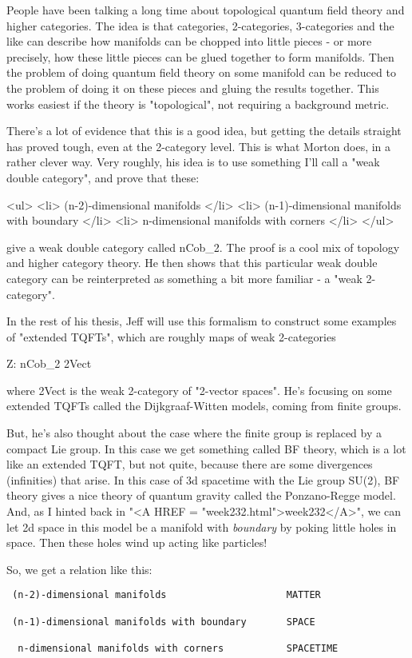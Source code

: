 People have been talking a long time about topological quantum field 
theory and higher categories.  The idea is that categories, 2-categories, 
3-categories and the like can describe how manifolds can be chopped into 
little pieces - or more precisely, how these little pieces can be glued 
together to form manifolds.  Then the problem of doing quantum field 
theory on some manifold can be reduced to the problem of doing it on 
these pieces and gluing the results together.  This works easiest if 
the theory is "topological", not requiring a background metric.

There's a lot of evidence that this is a good idea, but getting the details
straight has proved tough, even at the 2-category level.  This is what 
Morton does, in a rather clever way.  Very roughly, his idea is to use 
something I'll call a "weak double category", and prove that these:

<ul>
<li>
 (n-2)-dimensional manifolds
</li>
<li>
 (n-1)-dimensional manifolds with boundary
</li>
<li>
  n-dimensional manifolds with corners
</li>
</ul>

give a weak double category called nCob_{2}.  The proof is a
cool mix of topology and higher category theory.  He then shows that
this particular weak double category can be reinterpreted as something
a bit more familiar - a "weak 2-category".

In the rest of his thesis, Jeff will use this formalism to construct
some examples of "extended TQFTs", which are roughly maps of
weak 2-categories

Z: nCob_{2} \to  2Vect

where 2Vect is the weak 2-category of "2-vector spaces".  He's
focusing on some extended TQFTs called the Dijkgraaf-Witten models,
coming from finite groups.  

But, he's also thought about the case where the finite group is
replaced by a compact Lie group.  In this case we get something 
called BF theory, which is a lot like an extended TQFT, but not quite,
because there are some divergences (infinities) that arise. 
In this case of 3d spacetime with the Lie group SU(2), BF theory gives
a nice theory of quantum gravity called the Ponzano-Regge model.
And, as I hinted back in "<A HREF =
"week232.html">week232</A>", we can let 2d space in this model be
a manifold with \emph{boundary} by poking little holes in space.
Then these holes wind up acting like particles!

So, we get a relation like this:

\begin{verbatim}
 (n-2)-dimensional manifolds                     MATTER

 (n-1)-dimensional manifolds with boundary       SPACE

  n-dimensional manifolds with corners           SPACETIME
\end{verbatim}
    

